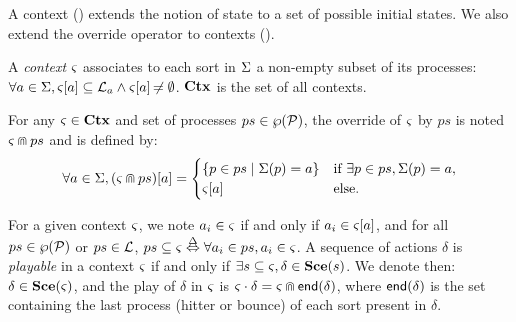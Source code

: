 A context () extends the notion of state to a set of possible initial states.
We also extend the override operator to contexts ().
\begin{definition}
\label{def:context}
  A \emph{context} $\varsigma$ associates to each sort in $\Sigma$ a non-empty subset of its processes:
  $\forall a \in \Sigma, {\varsigma[a]} \subseteq \mathcal{L}_a \wedge {\varsigma[a]} \not\nobreak\mkern -2mu = \emptyset$.
  $\mathbf{Ctx}$ is the set of all contexts.
\end{definition}
%
\begin{definition}[$\Cap: \Ctx \times \powerset(\PHproc) \rightarrow \Ctx$]
\label{def:ctxcap}
  For any $\varsigma\in\mathbf{Ctx}$ and set of processes $ps \in \wp(\mathcal{P})$,
  the override of $\varsigma$ by $ps$ is noted $\varsigma \Cap ps$ and is defined by:
  \[ \forall a \in \Sigma, {(\varsigma \Cap ps)[a]} =
  \begin{cases}
    \{ p \in ps \mid \Sigma(p)=a \} & \text{if } \exists p \in ps, \Sigma(p)=a,\\
    {\varsigma[a]} & \text{else.}
  \end{cases}
  \]
\end{definition}
\noindent
For a given context $\varsigma$, we note $a_i \in \varsigma$ if and only if $a_i \in {\varsigma[a]}$,
and for all $ps \in \wp(\mathcal{P})$ or $ps \in \mathcal{L}$, $ps \subseteq \varsigma \stackrel{\Delta}\Leftrightarrow \forall a_i \in ps, a_i \in \varsigma$.
A sequence of actions $\delta$ is \emph{playable} in a context $\varsigma$ if and only if 
$\exists s \subseteq \varsigma, \delta \in \mathbf{Sce}(s)$.
We denote then: $\delta \in \mathbf{Sce}(\varsigma)$,
and the play of $\delta$ in $\varsigma$ is $\varsigma \cdot \delta = \varsigma \Cap \mathsf{end}(\delta)$,
where $\mathsf{end}(\delta)$ is the set containing the last process (hitter or bounce) of each sort present in $\delta$.

\begin{comment}
  \begin{definition}[Objective sequence ($\OS$)]
  \label{def:OS}
  \towrite{Simplifier / réécrire en dehors d'une def}
    An \emph{objective sequence} is a sequence $\w = P_1 \concat \dots \concat P_{|\w|}$,
    where $\forall n \in \indexes{\w}, \w_n \in \Obj$ and $a_i = \PHtarget(\w_n) \Rightarrow \last_a(\w_{1..n-1}) \in \{ \varnothing, a_i \}$.
    The set of all objective sequences is denoted by $\OS$.
    The definitions of $\last_a$ \todo{À définir}, $\first_a$ \todo{À définir}, $\supp$ \todo{À définir} and $\ceil$ \todo{À définir}
    are simply derived by omitting the case of hitters.
  \end{definition}
\end{comment}

